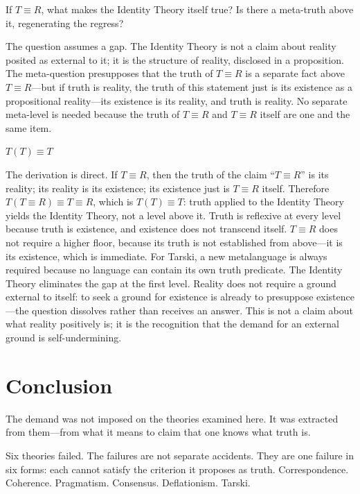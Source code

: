 \documentclass[11pt, oneside]{article}
\newcommand{\isolate}[1]{%
    \vspace{8pt}%
    \begin{center}\itshape #1\end{center}%
    \vspace{8pt}%
}
\begin{document}
If $T \equiv R$, what makes the Identity Theory itself true? Is there a
meta-truth above it, regenerating the regress?

The question assumes a gap. The Identity Theory is not a claim about
reality posited as external to it; it is the structure of reality,
disclosed in a proposition. The meta-question presupposes that the truth of
$T \equiv R$ is a separate fact above $T \equiv R$---but if truth is
reality, the truth of this statement just is its existence as a
propositional reality---its existence is its reality, and truth is
reality. No separate meta-level is needed because the truth of
$T \equiv R$ and $T \equiv R$ itself are one and the same item.

\isolate{$T(T) \equiv T$}

The derivation is direct. If $T \equiv R$, then the truth of the claim
``$T \equiv R$'' is its reality; its reality is its existence; its
existence just is $T \equiv R$ itself. Therefore $T(T \equiv R) \equiv
T \equiv R$, which is $T(T) \equiv T$: truth applied to the Identity
Theory yields the Identity Theory, not a level above it. Truth is
reflexive at every level because truth is existence, and existence does
not transcend itself. $T \equiv R$ does not require a higher floor,
because its truth is not established from above---it is its existence,
which is immediate. For Tarski, a new metalanguage is always required
because no language can contain its own truth predicate. The Identity
Theory eliminates the gap at the first level. Reality does not require a ground external to itself: to seek
a ground for existence is already to presuppose existence---the question
dissolves rather than receives an answer. This is not a claim about what
reality positively is; it is the recognition that the demand for an
external ground is self-undermining.

\section*{Conclusion}

\noindent The demand was not imposed on the theories examined here. It
was extracted from them---from what it means to claim that one knows what
truth is.

Six theories failed. The failures are not separate accidents. They are
one failure in six forms: each cannot satisfy the criterion it proposes
as truth. Correspondence. Coherence. Pragmatism. Consensus. Deflationism.
Tarski.
\end{document}
